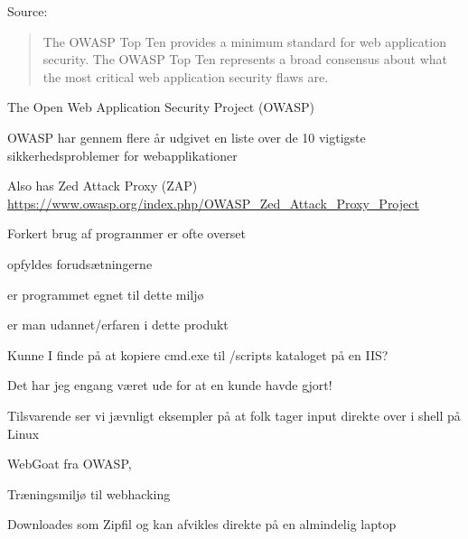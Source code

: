 \documentclass[Screen16to9,17pt]{foils}
\begin{document}
Source: 




\begin{quote}
The OWASP Top Ten provides a minimum standard for web application
security. The OWASP Top Ten represents a broad consensus about what
the most critical web application security flaws are.
\end{quote}

\begin{list1}
\item The Open Web Application Security Project (OWASP)
\item OWASP har gennem flere år udgivet en liste over de 10 vigtigste
  sikkerhedsproblemer for webapplikationer
\item {}
\item Also has Zed Attack Proxy (ZAP) \url{https://www.owasp.org/index.php/OWASP_Zed_Attack_Proxy_Project}
\end{list1}



\begin{list1}
\item Forkert brug af programmer er ofte overset
\begin{list2}
\item opfyldes forudsætningerne
\item er programmet egnet til dette miljø
\item er man udannet/erfaren i dette produkt
\end{list2}
\item Kunne I finde på at kopiere cmd.exe til
/scripts kataloget på en IIS?
\item Det har jeg engang været ude for at en kunde havde gjort!
\item Tilsvarende ser vi jævnligt eksempler på at folk tager input direkte over i shell på Linux
\end{list1}




\begin{list1}
\item WebGoat fra OWASP, 
\item Træningsmiljø til webhacking
\item Downloades som Zipfil og kan afvikles direkte på en almindelig laptop
\end{list1}
\end{document}

